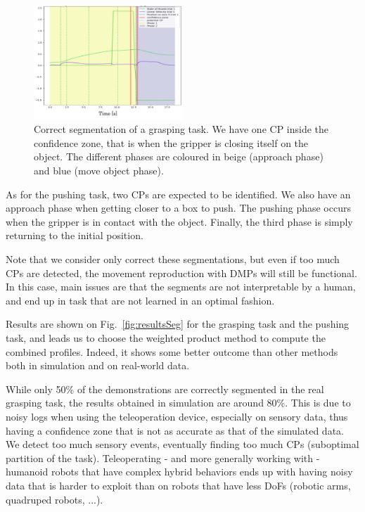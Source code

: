 \documentclass[conference]{IEEEtran}
\begin{document}
\begin{figure}[t]
  \centering
  \includegraphics[width=0.5\textwidth]{img/resolSeg.pdf}
  \caption{Correct segmentation of a grasping task. We have one CP inside the confidence zone, that is when the gripper is closing itself on the object. The different phases are coloured in beige (approach phase) and blue (move object phase).}
  \label{fig:coloredseg}
\end{figure}

As for the pushing task, two CPs are expected to be identified. We also have an approach phase when getting closer to a box to push. The pushing phase occurs when the gripper is in contact with the object. Finally, the third phase is simply returning to the initial position.

Note that we consider only correct these segmentations, but even if too much CPs are detected, the movement reproduction with DMPs will still be functional. In this case, main issues are that the segments are not interpretable by a human, and end up in task that are not learned in an optimal fashion.


Results are shown on Fig.~\ref{fig:resultsSeg} for the grasping task and the pushing task, and leads us to choose the weighted product method to compute the combined profiles. Indeed, it shows some better outcome than other methods both in simulation and on real-world data. 

While only 50\% of the demonstrations are correctly segmented in the real grasping task, the results obtained in simulation are around 80\%. This is due to noisy logs when using the teleoperation device, especially on sensory data, thus having a confidence zone that is not as accurate as that of the simulated data. We detect too much sensory events, eventually finding too much CPs (suboptimal partition of the task). Teleoperating - and more generally working with - humanoid robots that have complex hybrid behaviors ends up with having noisy data that is harder to exploit than on robots that have less DoFs (robotic arms, quadruped robots, ...).
\end{document}

